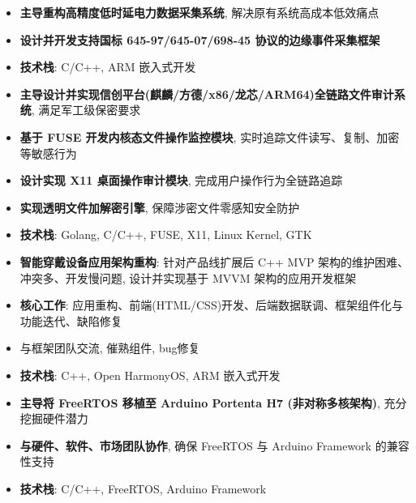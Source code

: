 \documentclass{resume}
\begin{document}
\begin{itemize}
  \item \textbf{主导重构高精度低时延电力数据采集系统}, 解决原有系统高成本低效痛点
  \item \textbf{设计并开发支持国标 645-97/645-07/698-45 协议的边缘事件采集框架}
  \item \textbf{技术栈}: C/C++, ARM 嵌入式开发
\end{itemize}

\begin{itemize}
  \item \textbf{主导设计并实现信创平台(麒麟/方德/x86/龙芯/ARM64)全链路文件审计系统}, 满足军工级保密要求
  \item \textbf{基于 FUSE 开发内核态文件操作监控模块}, 实时追踪文件读写、复制、加密等敏感行为
  \item \textbf{设计实现 X11 桌面操作审计模块}, 完成用户操作行为全链路追踪
  \item \textbf{实现透明文件加解密引擎}, 保障涉密文件零感知安全防护
  \item \textbf{技术栈}: Golang, C/C++, FUSE, X11, Linux Kernel, GTK
\end{itemize}

\begin{itemize}
  \item \textbf{智能穿戴设备应用架构重构}: 针对产品线扩展后 C++ MVP 架构的维护困难、冲突多、开发慢问题, 设计并实现基于 MVVM 架构的应用开发框架
  \item \textbf{核心工作}: 应用重构、前端(HTML/CSS)开发、后端数据联调、框架组件化与功能迭代、缺陷修复
  \item 与框架团队交流, 催熟组件, bug修复
  \item \textbf{技术栈}: C++, Open HarmonyOS, ARM 嵌入式开发
\end{itemize}

\begin{itemize}
  \item \textbf{主导将 FreeRTOS 移植至 Arduino Portenta H7 (非对称多核架构)}, 充分挖掘硬件潜力
  \item \textbf{与硬件、软件、市场团队协作}, 确保 FreeRTOS 与 Arduino Framework 的兼容性支持
  \item \textbf{技术栈}: C/C++, FreeRTOS, Arduino Framework
\end{itemize}
\end{document}
